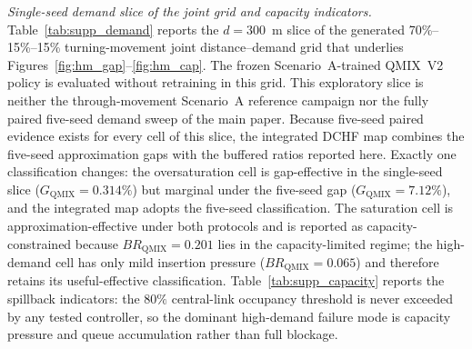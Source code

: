 \documentclass[12pt]{article}
\begin{document}
\textit{Single-seed demand slice of the joint grid and capacity indicators.}
Table~\ref{tab:supp_demand} reports the $d=300$~m slice of the generated
70\%--15\%--15\% turning-movement joint distance--demand grid that
underlies Figures~\ref{fig:hm_gap}--\ref{fig:hm_cap}. The frozen
Scenario~A-trained QMIX~V2 policy is evaluated without retraining in this
grid. This exploratory slice is neither the through-movement Scenario~A
reference campaign nor the fully paired five-seed demand sweep of the
main paper. Because five-seed paired evidence exists for
every cell of this slice, the integrated DCHF map combines the five-seed
approximation gaps with the buffered ratios reported here. Exactly one
classification changes: the oversaturation cell is gap-effective in the
single-seed slice ($G_{\mathrm{QMIX}}=0.314\%$) but marginal under the five-seed
gap ($G_{\mathrm{QMIX}}=7.12\%$), and the integrated map adopts the five-seed
classification. The saturation cell is approximation-effective under both
protocols and is reported as capacity-constrained because
$BR_{\mathrm{QMIX}}=0.201$ lies in the capacity-limited regime; the high-demand
cell has only mild insertion pressure ($BR_{\mathrm{QMIX}}=0.065$) and therefore
retains its useful-effective classification. Table~\ref{tab:supp_capacity}
reports the spillback indicators: the $80\%$ central-link occupancy threshold is
never exceeded by any tested controller, so the dominant high-demand failure mode is capacity pressure and
queue accumulation rather than full blockage.
\end{document}
